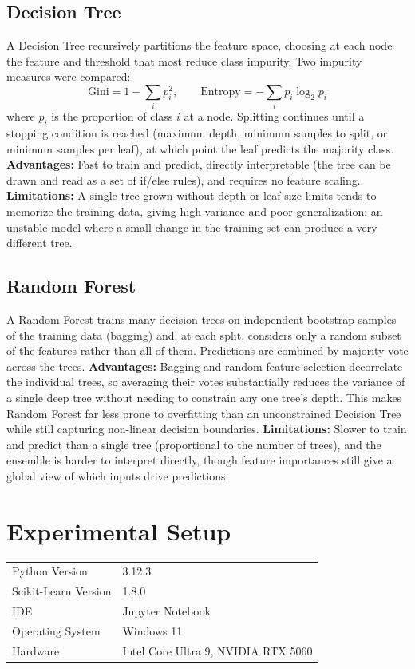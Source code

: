 \documentclass[12pt,a4paper]{article}
\begin{document}
\subsection*{Decision Tree}
A Decision Tree recursively partitions the feature space, choosing at each node the
feature and threshold that most reduce class impurity. Two impurity measures were
compared:
\[
\text{Gini} = 1 - \sum_{i} p_i^2, \qquad
\text{Entropy} = -\sum_{i} p_i \log_2 p_i
\]
where $p_i$ is the proportion of class $i$ at a node. Splitting continues until a
stopping condition is reached (maximum depth, minimum samples to split, or minimum
samples per leaf), at which point the leaf predicts the majority class.
\textbf{Advantages:} Fast to train and predict, directly interpretable (the tree can be
drawn and read as a set of if/else rules), and requires no feature scaling.
\textbf{Limitations:} A single tree grown without depth or leaf-size limits tends to
memorize the training data, giving high variance and poor generalization: an unstable
model where a small change in the training set can produce a very different tree.

\subsection*{Random Forest}
A Random Forest trains many decision trees on independent bootstrap samples of the
training data (bagging) and, at each split, considers only a random subset of the
features rather than all of them. Predictions are combined by majority vote across the
trees.
\textbf{Advantages:} Bagging and random feature selection decorrelate the individual
trees, so averaging their votes substantially reduces the variance of a single deep
tree without needing to constrain any one tree's depth. This makes Random Forest far
less prone to overfitting than an unconstrained Decision Tree while still capturing
non-linear decision boundaries.
\textbf{Limitations:} Slower to train and predict than a single tree (proportional to
the number of trees), and the ensemble is harder to interpret directly, though feature
importances still give a global view of which inputs drive predictions.

\section{Experimental Setup}
\begin{tabular}{ll}
\toprule
Python Version & 3.12.3 \\
Scikit-Learn Version & 1.8.0 \\
IDE & Jupyter Notebook \\
Operating System & Windows 11 \\
Hardware & Intel Core Ultra 9, NVIDIA RTX 5060 \\
\bottomrule
\end{tabular}
\end{document}
